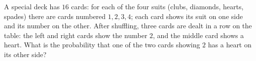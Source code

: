 A special deck has $16$ cards: for each of the four suits (clubs, diamonds, hearts, spades) there are cards numbered $1,2,3,4$; each card shows its suit on one side and its number on the other. After shuffling, three cards are dealt in a row on the table: the left and right cards show the number $2$, and the middle card shows a heart. What is the probability that one of the two cards showing $2$ has a heart on its other side?
